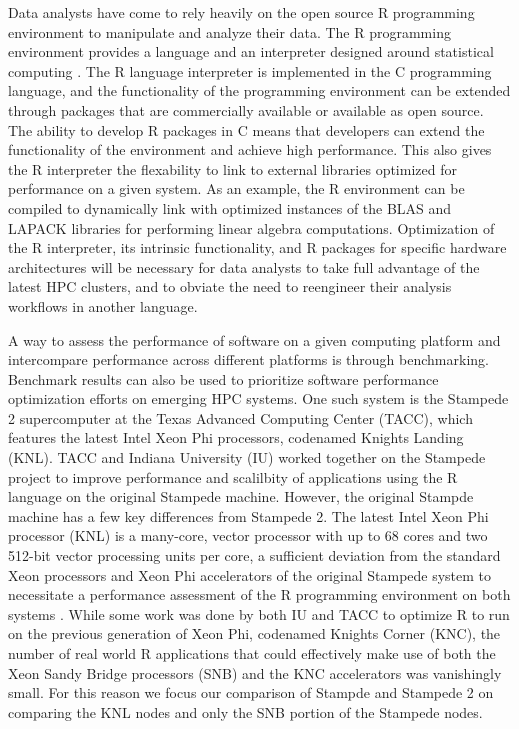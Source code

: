 Data analysts have come to rely heavily on the open source R programming environment to
manipulate and analyze their data. The R programming environment provides a language and
an interpreter designed around statistical computing \cite{ihaka:R}. The R language
interpreter is implemented in the C programming language, and the functionality of the
programming environment can be extended through packages that are commercially available
or available as open source. The ability to develop R packages in C means that developers
can extend the functionality of the environment and achieve high performance. This also
gives the R interpreter the flexability to link to external libraries optimized for
performance on a given system. As an example, the R environment can be compiled to
dynamically link with optimized instances of the BLAS \cite{dongarra:1990blas} and LAPACK
\cite{hammarling:1988blas} libraries for performing linear algebra computations.
Optimization of the R interpreter, its intrinsic functionality, and R packages for
specific hardware architectures will be necessary for data analysts to take full advantage
of the latest HPC clusters, and to obviate the need to reengineer their analysis workflows
in another language.

A way to assess the performance of software on a given computing platform and intercompare
performance across different platforms is through benchmarking. Benchmark results can also
be used to prioritize software performance optimization efforts on emerging HPC systems.
One such system is the Stampede 2 supercomputer at the Texas Advanced Computing Center
(TACC), which features the latest Intel Xeon Phi processors, codenamed Knights Landing
(KNL). TACC and Indiana University (IU) worked together on the Stampede project to
improve performance and scalilbity of applications using the R language on the original
Stampede machine. However, the original Stampde machine has a few key differences from
Stampede 2. The latest Intel Xeon Phi processor (KNL) is a many-core, vector processor
with up to 68 cores and two 512-bit vector processing units per core, a sufficient
deviation from the standard Xeon processors and Xeon Phi accelerators of the original
Stampede system to necessitate a performance assessment of the R programming environment
on both systems \cite{tacc:stampedeGuide}. While some work was done by both IU and TACC to
optimize R to run on the previous generation of Xeon Phi, codenamed Knights Corner (KNC),
the number of real world R applications that could effectively make use of both the Xeon
Sandy Bridge processors (SNB) and the KNC accelerators was vanishingly small. For this
reason we focus our comparison of Stampde and Stampede 2 on comparing the KNL nodes and
only the SNB portion of the Stampede nodes.

